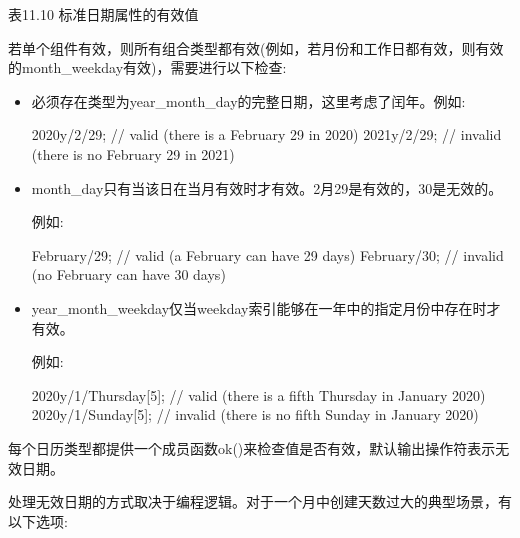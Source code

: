 \begin{center}
表11.10 标准日期属性的有效值
\end{center}

若单个组件有效，则所有组合类型都有效(例如，若月份和工作日都有效，则有效的month\_weekday有效)，需要进行以下检查:

\begin{itemize}
\item
必须存在类型为year\_month\_day的完整日期，这里考虑了闰年。例如:

\begin{cpp}
2020y/2/29; // valid (there is a February 29 in 2020)
2021y/2/29; // invalid (there is no February 29 in 2021)
\end{cpp}

\item
month\_day只有当该日在当月有效时才有效。2月29是有效的，30是无效的。

例如:

\begin{cpp}
February/29; // valid (a February can have 29 days)
February/30; // invalid (no February can have 30 days)
\end{cpp}

\item
year\_month\_weekday仅当weekday索引能够在一年中的指定月份中存在时才有效。

例如:

\begin{cpp}
2020y/1/Thursday[5]; // valid (there is a fifth Thursday in January 2020)
2020y/1/Sunday[5]; // invalid (there is no fifth Sunday in January 2020)
\end{cpp}
\end{itemize}

每个日历类型都提供一个成员函数ok()来检查值是否有效，默认输出操作符表示无效日期。

处理无效日期的方式取决于编程逻辑。对于一个月中创建天数过大的典型场景，有以下选项:

